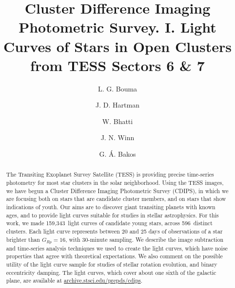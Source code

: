 \documentclass[12pt,twocolumn,tighten]{aastex62}
\newcommand{\numberlcs}{159{,}343\ } %
\newcommand{\numberclusters}{596\ } %
\newcommand{\stscilink}{\url{archive.stsci.edu/prepds/cdips}}
\begin{document}
\title{
  Cluster Difference Imaging Photometric Survey. I.
  Light Curves of Stars in Open Clusters from TESS Sectors 6 \& 7
}


\author[0000-0002-0514-5538]{L. G. Bouma}
%
\author[0000-0001-8732-6166]{J. D. Hartman}
%
\author[0000-0002-0628-0088]{W. Bhatti}
%
\author[0000-0002-4265-047X]{J. N. Winn}
%
\author[0000-0001-7204-6727]{G. \'A. Bakos}

\begin{abstract}
  The Transiting Exoplanet Survey Satellite (TESS) is providing
  precise time-series photometry for most star clusters in the
  solar neighborhood.
  Using the TESS images, we have begun a Cluster Difference Imaging
  Photometric Survey (CDIPS), in which we are focusing 
  both on stars that are candidate cluster members, and on stars that show indications of youth.
  Our aims are to discover giant transiting planets with known ages,
  and to provide light curves suitable for studies in stellar
  astrophysics.
  For this work, we made \numberlcs light curves of candidate young
  stars, across \numberclusters distinct clusters.  Each light curve
  represents between 20 and 25 days of observations of a star brighter
  than $G_{Rp}=16$, with 30-minute sampling.
  We describe the image subtraction and time-series analysis
  techniques we used to create the light curves, which have noise
  properties that agree with theoretical expectations.
  We also comment on the possible utility of the light curve sample
  for studies of stellar rotation evolution, and binary eccentricity
  damping.
  The light curves, which cover about one sixth of the galactic plane,
  are available at \stscilink.
\end{abstract}

\end{document}
